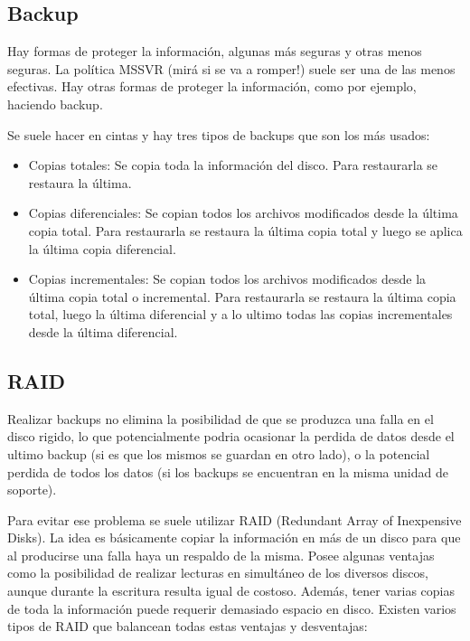 \documentclass{article}
\begin{document}
\subsection{Backup}

Hay formas de proteger la informaci\'on, algunas m\'as seguras y otras menos seguras. La pol\'itica MSSVR (mir\'a si se va a romper!) suele ser una de las menos efectivas. Hay otras formas de proteger la informaci\'on, como por ejemplo, haciendo backup.

Se suele hacer en cintas y hay tres tipos de backups que son los m\'as usados:

\begin{itemize}
\item Copias totales: Se copia toda la informaci\'on del disco. Para restaurarla se restaura la última.
\item Copias diferenciales: Se copian todos los archivos modificados desde la \'ultima copia total. Para restaurarla se restaura la última copia total y luego se aplica la última copia diferencial.
\item Copias incrementales: Se copian todos los archivos modificados desde la \'ultima copia total o incremental. Para restaurarla se restaura la última copia total, luego la última diferencial y a lo ultimo todas las copias incrementales desde la última diferencial.
\end{itemize}

\subsection{RAID}

Realizar backups no elimina la posibilidad de que se produzca una falla en el disco rigido, lo que potencialmente podria ocasionar la perdida de datos desde el ultimo backup (si es que los mismos se guardan en otro lado), o la potencial perdida de todos los datos (si los backups se encuentran en la misma unidad de soporte).

Para evitar ese problema se suele utilizar RAID (Redundant Array of Inexpensive Disks). La idea es b\'asicamente copiar la informaci\'on en m\'as de un disco para que al producirse una falla haya un respaldo de la misma. Posee algunas ventajas como la posibilidad de realizar lecturas en simult\'aneo de los diversos discos, aunque durante la escritura resulta igual de costoso. Adem\'as, tener varias copias de toda la informaci\'on puede requerir demasiado espacio en disco. Existen varios tipos de RAID que balancean todas estas ventajas y desventajas:
\end{document}
